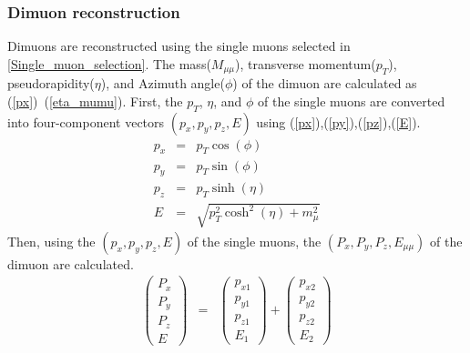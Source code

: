             \subsubsection{Dimuon reconstruction}
            \label{Dimuon_reco}
                Dimuons are reconstructed using the single muons selected in \ref{Single_muon_selection}. The mass($M_{\mu\mu}$), transverse momentum($p_T$), pseudorapidity($\eta$), and Azimuth angle($\phi$) of the dimuon are calculated as (\ref{px})~(\ref{eta_mumu}). First, the $p_T$, $\eta$, and $\phi$ of the single muons are converted into four-component vectors $(p_x, p_y, p_z, E)$ using (\ref{px}),(\ref{py}),(\ref{pz}),(\ref{E}).\@
                \begin{eqnarray}
                    p_x &=& p_T \cos(\phi)\\ \label{px}
                    p_y &=& p_T \sin (\phi)\\ \label{py}
                    p_z &=& p_T \sinh (\eta)\\ \label{pz}
                    E &=& \sqrt{p_T^2 \cosh^2(\eta) + m_\mu^2} \label{E} 
                \end{eqnarray}
                Then, using the $(p_x, p_y, p_z, E)$ of the single muons, the $(P_x, P_y, P_z, E_{\mu\mu})$ of the dimuon are calculated.
                \begin{eqnarray}
                    \begin{pmatrix}
                        P_x \\
                        P_y \\
                        P_z \\
                        E
                    \end{pmatrix}
                    &=&
                    \begin{pmatrix}
                        p_{x1} \\
                        p_{y1} \\
                        p_{z1} \\
                        E_1
                    \end{pmatrix}
                    +
                    \begin{pmatrix}
                        p_{x2} \\
                        p_{y2} \\
                        p_{z2} \\
                        E_2
                    \end{pmatrix}
                \end{eqnarray}
